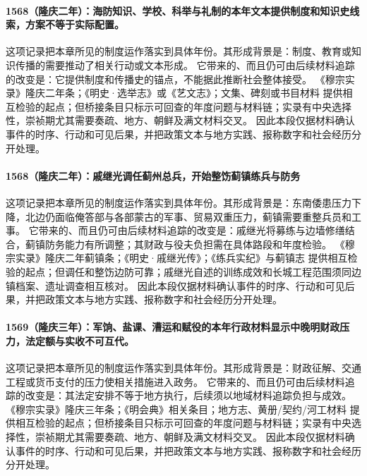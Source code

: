 \paragraph{1568（隆庆二年）：海防知识、学校、科举与礼制的本年文本提供制度和知识史线索，方案不等于实际配置。} 这项记录把本章所见的制度运作落实到具体年份。其形成背景是：制度、教育或知识传播的需要推动了相关行动或文本形成。 它带来的、而且仍可由后续材料追踪的改变是：它提供制度和传播史的锚点，不能据此推断社会整体接受。 《穆宗实录》隆庆二年条；《明史·选举志》或《艺文志》；文集、碑刻或书目材料 提供相互检验的起点；但桥接条目只标示可回查的年度问题与材料链；实录有中央选择性，崇祯期尤其需要奏疏、地方、朝鲜及满文材料交叉。 因此本段仅据材料确认事件的时序、行动和可见后果，并把政策文本与地方实践、报称数字和社会经历分开处理。

\paragraph{1568（隆庆二年）：戚继光调任蓟州总兵，开始整饬蓟镇练兵与防务} 这项记录把本章所见的制度运作落实到具体年份。其形成背景是：东南倭患压力下降，北边仍面临俺答部与各部蒙古的军事、贸易双重压力，蓟镇需要重整兵员和工事。 它带来的、而且仍可由后续材料追踪的改变是：戚继光将募练与边墙修缮结合，蓟镇防务能力有所调整；其财政与役夫负担需在具体路段和年度检验。 《穆宗实录》隆庆二年蓟镇条；《明史·戚继光传》；《练兵实纪》与蓟镇志 提供相互检验的起点；但调任和整饬边防可靠；戚继光自述的训练成效和长城工程范围须同边镇档案、遗址调查相互核对。 因此本段仅据材料确认事件的时序、行动和可见后果，并把政策文本与地方实践、报称数字和社会经历分开处理。

\paragraph{1569（隆庆三年）：军饷、盐课、漕运和赋役的本年行政材料显示中晚明财政压力，法定额与实收不可互代。} 这项记录把本章所见的制度运作落实到具体年份。其形成背景是：财政征解、交通工程或货币支付的压力使相关措施进入政务。 它带来的、而且仍可由后续材料追踪的改变是：其法定安排不等于地方执行，后续须以地域材料追踪负担与成效。 《穆宗实录》隆庆三年条；《明会典》相关条目；地方志、黄册/契约/河工材料 提供相互检验的起点；但桥接条目只标示可回查的年度问题与材料链；实录有中央选择性，崇祯期尤其需要奏疏、地方、朝鲜及满文材料交叉。 因此本段仅据材料确认事件的时序、行动和可见后果，并把政策文本与地方实践、报称数字和社会经历分开处理。

